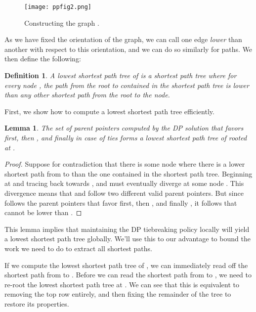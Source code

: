 \documentclass{article}
\newtheorem{definition}{Definition}
\newtheorem{lemma}{Lemma}
\begin{document}
\begin{figure}[htb]
  \centering
  \texttt{[image: ppfig2.png]}
  \caption{Constructing the graph .}
  \label{fig:biggraph}
\end{figure}

As we have fixed the orientation of the graph, we can call one edge \emph{lower} than another with respect to this orientation, and we can do so similarly for paths.  We then define the following:

\begin{definition}
A \emph{lowest shortest path tree} of  is a shortest path tree where for every node , the path from the root to  contained in the shortest path tree is lower than any other shortest path from the root to the node.
\end{definition}

First, we show how to compute a lowest shortest path tree efficiently.

\begin{lemma}
The set of parent pointers computed by the DP solution that favors   first, then , and finally  in case of ties forms a lowest shortest path tree of  rooted at .
\end{lemma}
\begin{proof}
Suppose for contradiction that there is some node  where there is a lower shortest path  from  to  than the one  contained in the shortest path tree.  Beginning at  and tracing back towards ,  and  must eventually diverge at some node .  This divergence means that  and  follow two different valid parent pointers.  But since  follows the parent pointers that favor   first, then , and finally , it follows that  cannot be lower than .
\end{proof}

This lemma implies that maintaining the DP tiebreaking policy locally will yield a lowest shortest path tree globally.  We'll use this to our advantage to bound the work we need to do to extract all  shortest paths.

If we compute the lowest shortest path tree of , we can immediately read off the shortest path from  to .  Before we can read the shortest path from  to , we need to re-root the lowest shortest path tree at .  We can see that this is equivalent to removing the top row entirely, and then fixing the remainder of the tree to restore its properties.
\end{document}
